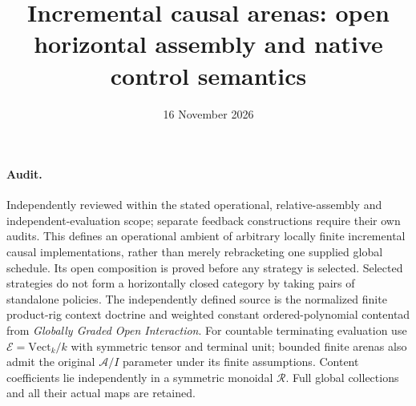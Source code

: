 \documentclass[11pt]{article}
\title{Incremental causal arenas: open horizontal assembly and native control semantics}
\date{16 November 2026}
\begin{document}
\maketitle
\paragraph{Audit.} Independently reviewed within the stated operational, relative-assembly and independent-evaluation scope; separate feedback constructions require their own audits. This defines an operational ambient of arbitrary locally finite incremental causal implementations, rather than merely rebracketing one supplied global schedule. Its open composition is proved before any strategy is selected. Selected strategies do not form a horizontally closed category by taking pairs of standalone policies. The independently defined source is the normalized finite product-rig context doctrine and weighted constant ordered-polynomial contentad from \emph{Globally Graded Open Interaction}. For countable terminating evaluation use $\mathcal E=\mathrm{Vect}_k/k$ with symmetric tensor and terminal unit; bounded finite arenas also admit the original $\mathcal A/I$ parameter under its finite assumptions. Content coefficients lie independently in a symmetric monoidal $\mathcal R$. Full global collections and all their actual maps are retained.
\end{document}

